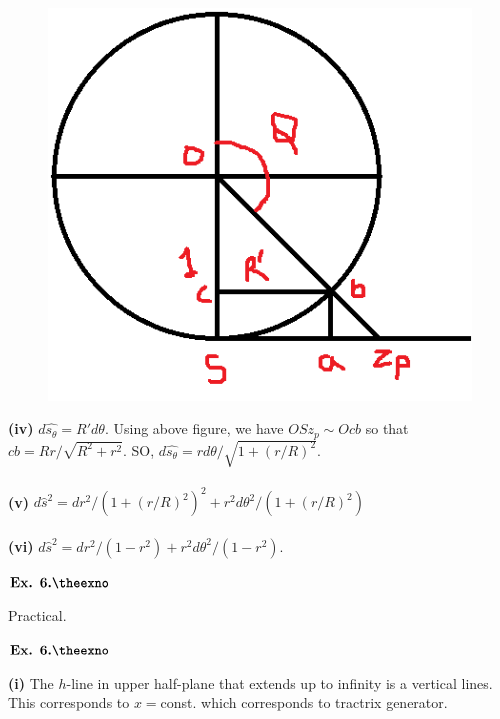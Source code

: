 \documentclass{article}
\def\tf{\textbf}
\newcounter{exno}
\begin{document}
\begin{figure}[h!]
    \centering
    \includegraphics[scale=0.7]{6_14_3}
    \label{6_14_3}
\end{figure}

\tf{(iv)} $d\hat{s_{\theta}} = R'd\theta$. Using above figure, we have $OSz_p \sim Ocb$ so that $cb = Rr/\sqrt{R^2+r^2}$. SO, $d\hat{s_{\theta}} = rd\theta/\sqrt{1+(r/R)^2}$.\\~\\

\tf{(v)} $d\hat{s}^2 = dr^2/(1+(r/R)^2)^2 + r^2d\theta^2/(1+(r/R)^2)$\\~\\

\tf{(vi)} $d\hat{s}^2 = dr^2/(1-r^2) + r^2d\theta^2/(1-r^2)$.

\vspace{0.2in}

${\textbf{Ex. 6.\theexno}}$
\addtocounter{exno}{1}

Practical.

\vspace{0.2in}

${\textbf{Ex. 6.\theexno}}$
\addtocounter{exno}{1}

\tf{(i)} The $h$-line in upper half-plane that extends up to infinity is a vertical lines. This corresponds to $x=$const. which corresponds to tractrix generator.\\~\\
\end{document}
